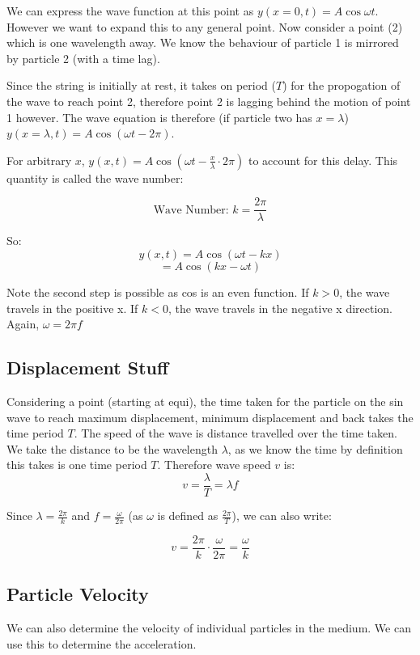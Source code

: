 We can express the wave function at this point as $y(x = 0, t) = A \cos \omega t$. However we want to expand this to any general point. Now consider a point (2) which is one wavelength away. We know the behaviour of particle 1 is mirrored by particle 2 (with a time lag).

Since the string is initially at rest, it takes on period ($T$) for the propogation of the wave to reach point 2, therefore point 2 is lagging behind the motion of point 1 however. The wave equation is therefore (if particle two has $x = \lambda$) $y(x = \lambda, t) = A \cos (\omega t - 2\pi)$. 

For arbitrary $x$, $y(x, t) = A \cos(\omega t - \frac{x}{\lambda}\cdot 2 \pi)$ to account for this delay. This quantity is called the wave number:

\[
    \text{Wave Number: } k = \frac{2 \pi}{\lambda}
\]

So:
\[
    y(x,t) = A \cos(\omega t - k x)
\]
\[
    = A \cos(kx - \omega t)
\]

Note the second step is possible as cos is an even function. If $k > 0$, the wave travels in the positive x. If $k < 0$, the wave travels in the negative x direction. Again, $\omega = 2 \pi f$

\subsection*{Displacement Stuff}
Considering a point (starting at equi), the time taken for the particle on the sin wave to reach maximum displacement, minimum displacement and back takes the time period $T$. The speed of the wave is distance travelled over the time taken. We take the distance to be the wavelength $\lambda$, as we know the time by definition this takes is one time period $T$. Therefore wave speed $v$ is:
\[
    v = \frac{\lambda}{T} = \lambda f
\]

Since $\lambda = \frac{2 \pi}{k}$ and $f = \frac{\omega}{2 \pi}$ (as $\omega$ is defined as $\frac{2 \pi}{T}$), we can also write:

\[
    v = \frac{2 \pi}{k} \cdot \frac{\omega}{2 \pi} = \frac{\omega}{k}
\]

\subsection*{Particle Velocity}
We can also determine the velocity of individual particles in the medium. We can use this to determine the acceleration.

